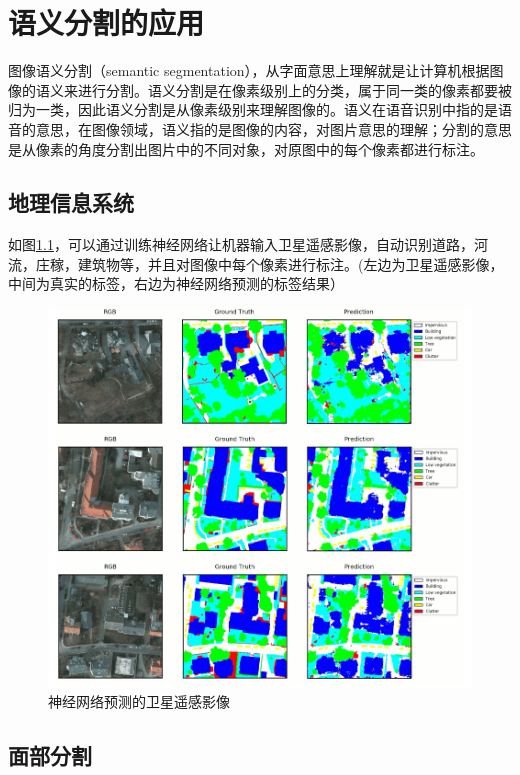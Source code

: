 
\chapter{语义分割的应用}

图像语义分割（semantic
segmentation），从字面意思上理解就是让计算机根据图像的语义来进行分割。语义分割是在像素级别上的分类，属于同一类的像素都要被归为一类，因此语义分割是从像素级别来理解图像的。语义在语音识别中指的是语音的意思，在图像领域，语义指的是图像的内容，对图片意思的理解；分割的意思是从像素的角度分割出图片中的不同对象，对原图中的每个像素都进行标注。

\section{地理信息系统}

如图\ref{fig::apply_pic1}，可以通过训练神经网络让机器输入卫星遥感影像，自动识别道路，河流，庄稼，建筑物等，并且对图像中每个像素进行标注。(左边为卫星遥感影像，中间为真实的标签，右边为神经网络预测的标签结果）
\begin{figure}[htbp]
\centering
\includegraphics[width=1\linewidth]{body/apply_pic/1}
\caption{神经网络预测的卫星遥感影像}
\label{fig::apply_pic1}
\end{figure}

\section{面部分割}

